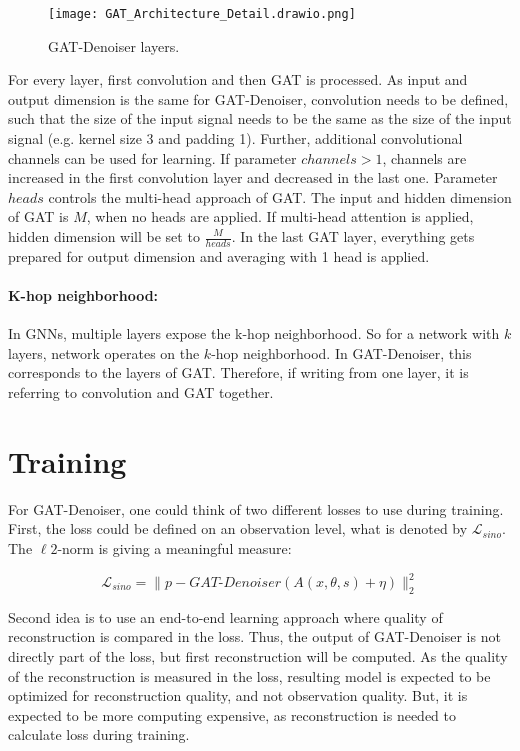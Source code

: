\begin{figure}[H]
  \centering
  \texttt{[image: GAT\_Architecture\_Detail.drawio.png]}
  \caption{GAT-Denoiser layers.}
  \label{fig:architecture-detailed}
\end{figure}


For every layer, first convolution and then GAT is processed. 
As input and output dimension is the same for GAT-Denoiser,
convolution needs to be defined, such that the size of the input signal needs to be the same as the size of the input signal
(e.g. kernel size 3 and padding 1).
Further, additional convolutional channels can be used for learning.
If parameter $channels > 1$, channels are increased in the first convolution layer 
and decreased in the last one.
Parameter $heads$ controls the multi-head approach of GAT. The input and hidden dimension
of GAT is $M$, when no heads are applied.
If multi-head attention is applied, hidden dimension will be set to $\frac{M}{heads}$.
In the last GAT layer, everything gets prepared for output dimension and 
averaging with 1 head is applied.

\paragraph{K-hop neighborhood:}
In GNNs, multiple layers expose the k-hop neighborhood. So for a network with $k$ layers,
network operates on the $k$-hop neighborhood. In GAT-Denoiser, this corresponds
to the layers of GAT. Therefore, if writing from one layer, it is referring to convolution and GAT together.

\section{Training}

For GAT-Denoiser, one could think of two different losses to use during training.
First, the loss could be defined on an observation level, what is denoted by $\mathcal{L}_{sino}$. 
The $\ell2$-norm is giving a meaningful measure:

\begin{equation}
  \label{eq:loss_sino}
  \mathcal{L}_{sino} = \parallel p - \textit{GAT-Denoiser}(A(x, \theta, s) + \eta) \parallel ^2_2
\end{equation}

Second idea is to use an end-to-end learning approach where quality of reconstruction is 
compared in the loss. Thus, the output of GAT-Denoiser is not directly part of the loss, but first reconstruction will be computed.
As the quality of the reconstruction is measured in the loss, resulting model is expected to be optimized
for reconstruction quality, and not observation quality. But, it is expected to be more computing expensive,
as reconstruction is needed to calculate loss during training.

